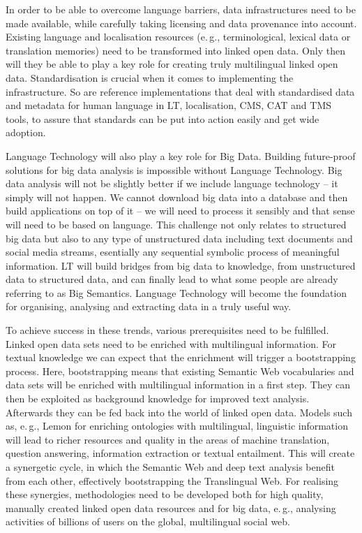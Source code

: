 \documentclass[10pt, plain]{../../metanetpaper}
\begin{document}
\begin{multicols}{2}
In order to be able to overcome language barriers, data infrastructures need to be made available, while carefully taking licensing and data provenance into account. Existing language and localisation resources (e.\,g., terminological, lexical data or translation memories) need to be transformed into linked open data. Only then will they be able to play a key role for creating truly multilingual linked open data.  Standardisation is crucial when it comes to implementing the infrastructure. So are reference implementations that deal with standardised data and metadata for human language in LT, localisation, CMS, CAT and TMS tools, to assure that standards can be put into action easily and get wide adoption.

Language Technology will also play a key role for Big Data. Building future-proof solutions for big data analysis is impossible without Language Technology. Big data analysis will not be slightly better if we include language technology -- it simply will not happen. We cannot download big data into a database and then build applications on top of it -- we will need to process it sensibly and that sense will need to be based on language. This challenge not only relates to structured big data but also to any type of unstructured data including text documents and social media streams, esentially any sequential symbolic process of meaningful information. LT will build bridges from big data to knowledge, from unstructured data to structured data, and can finally lead to what some people are already referring to as Big Semantics. Language Technology will become the foundation for organising, analysing and extracting data in a truly useful way.

To achieve success in these trends, various prerequisites need to be fulfilled. Linked open data sets need to be enriched with multilingual information. For textual knowledge we can expect that the enrichment will trigger a bootstrapping process. Here, bootstrapping means that existing Semantic Web vocabularies and data sets will be enriched with multilingual information in a first step. They can then be exploited as background knowledge for improved text analysis. Afterwards they can be fed back into the world of linked open data. Models such as, e.\,g., Lemon for enriching ontologies with multilingual, linguistic information will lead to richer resources and quality in the areas of machine translation, question answering, information extraction or textual entailment. This will create a synergetic cycle, in which the Semantic Web and deep text analysis benefit from each other, effectively bootstrapping the Translingual Web. For realising these synergies, methodologies need to be developed both for high quality, manually created linked open data resources and for big data, e.\,g., analysing activities of billions of users on the global, multilingual social web.


\end{multicols}
\end{document}
